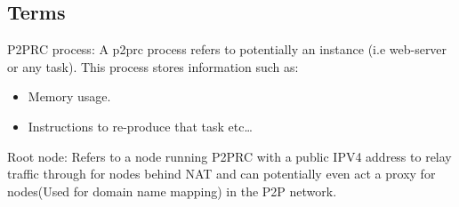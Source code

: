 \documentclass[11pt]{article}
\begin{document}
\subsection{Terms}
\label{sec:orgd859ef0}
P2PRC process: A p2prc process refers to potentially an instance (i.e web-server or any task). This process
stores information such as:
\begin{itemize}
\item Memory usage.
\item Instructions to re-produce that task etc\ldots{}
\end{itemize}

Root node: Refers to a node running P2PRC with a public IPV4 address to relay traffic through for nodes
behind NAT and can potentially even act a proxy for nodes(Used for domain name mapping) in the P2P network.  
\end{document}
